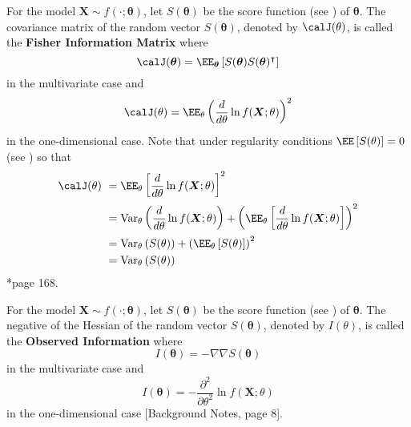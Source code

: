 \begin{defe} \label{defe: fim}
    For the model $\bm{X} \sim f(\cdot ; \bm{\theta})$, let $S(\bm{\theta})$ be the score function (see ) of $\bm{\theta}$. The covariance matrix of the random vector $S(\bm{\theta})$, denoted by $\calJ (\theta)$, is called the {\bf Fisher Information Matrix} where
    \begin{equation*}
        \calJ (\bm{\theta}) = \EE_{\bm{\theta}} \left[ S(\bm{\theta}) S(\bm{\theta})^{\intercal} \right]
    \end{equation*}
    in the multivariate case and
    \begin{equation*}
        \calJ (\theta) = \EE_{\theta} \left( \frac{d}{d \theta} \ln f(\bm{X} ; \theta) \right)^2
    \end{equation*}
    in the one-dimensional case. Note that under regularity conditions $\EE \left[ S (\theta) \right] = 0$ (see ) so that
    \begin{align*}
        \calJ (\theta) \
         & = \EE_{\theta} \left[ \frac{d}{d \theta} \ln f(\bm{X} ; \theta) \right]^2                                                                                         \\
         & = \Var_{\theta} \left( \frac{d}{d \theta} \ln f(\bm{X} ; \theta) \right) + \left( \EE_{\theta} \left[ \frac{d}{d \theta} \ln f(\bm{X} ; \theta) \right] \right)^2 \\
         & = \Var_{\theta} \left( S (\theta) \right) + \left( \EE_{\theta} \left[ S (\theta) \right] \right)^2                                                               \\
         & = \Var_{\theta} \left( S (\theta) \right)
    \end{align*}
    \cite{KroeseDirkP2013SMaC}*{page 168}.
\end{defe}

\begin{defe}[Observed Information] \label{defe: oim}
    For the model $\bm{X} \sim f(\cdot ; \bm{\theta})$, let $S(\bm{\theta})$ be the score function (see ) of $\bm{\theta}$. The negative of the Hessian of the random vector $S(\bm{\theta})$, denoted by $I (\theta)$, is called the {\bf Observed Information} where
    \begin{equation*}
        I (\bm{\theta}) = - \nabla \nabla S(\bm{\theta})
    \end{equation*}
    in the multivariate case and
    \begin{equation*}
        I (\bm{\theta}) = - \frac{\partial^2}{\partial \theta^2} \ln f(\bm{X} ; \theta)
    \end{equation*}
    in the one-dimensional case [Background Notes, page 8].
\end{defe}

